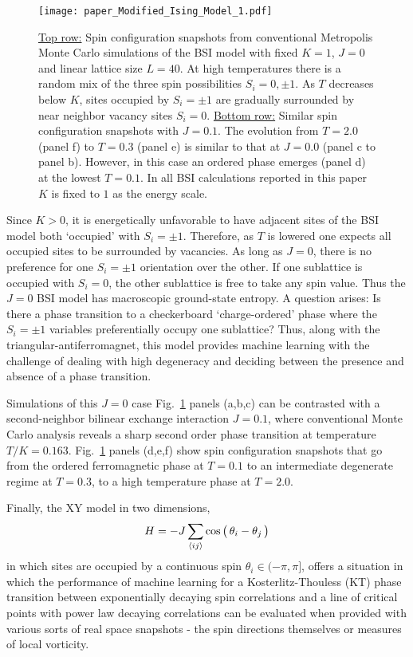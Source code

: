 \documentclass[pra,letterpaper,10pt,twocolumn]{revtex4}
\begin{document}
\begin{figure}[!h]
\texttt{[image: paper\_Modified\_Ising\_Model\_1.pdf]}  
\caption{
\underline{Top row:} Spin configuration snapshots from conventional
Metropolis Monte Carlo simulations of the BSI model with fixed $K=1$,
$J=0$ and linear lattice size $L=40$.  At high temperatures there is a
random mix of the three spin possibilities $S_i = 0,\pm 1$.  As $T$
decreases below $K$, sites occupied by $S_i = \pm 1$ are gradually surrounded by
near neighbor vacancy sites $S_i=0$.  \underline{Bottom row:} Similar
spin configuration snapshots with $J=0.1$.  The evolution from $T=2.0$
(panel f) to $T=0.3$ (panel e) is similar to that at $J=0.0$ (panel c to
panel b).  However, in this case an ordered phase emerges (panel d) at
the lowest $T=0.1$.  In all BSI calculations reported in this paper $K$
is fixed to $1$ as the energy scale.  
\label{fig:Modified_Ising_Model_1}
}
\end{figure}

Since $K>0$, it is energetically unfavorable to have adjacent sites of
the BSI model both `occupied' with $S_i=\pm 1$.  Therefore, as $T$ is
lowered one expects all occupied sites to be surrounded by vacancies.
As long as $J=0$, there is no preference for one $S_i=\pm1$ orientation
over the other. 
If one sublattice is occupied with $S_i=0$, the other
sublattice is free to take any spin value. 
Thus the $J=0$ BSI model has
macroscopic ground-state entropy. A question arises: Is there a phase
transition to a checkerboard `charge-ordered' phase where the $S_i=\pm
1$ variables preferentially occupy one sublattice?  Thus, along with the
triangular-antiferromagnet, this model provides machine learning with
the challenge of dealing with high degeneracy and deciding between the
presence and absence of a phase transition.

Simulations of this $J=0$ case Fig.~\ref{fig:Modified_Ising_Model_1}
panels (a,b,c) can be contrasted with a second-neighbor bilinear
exchange interaction $J=0.1$, where conventional Monte Carlo analysis
reveals a sharp second order phase transition at temperature
$T/K=0.163$.  Fig.~\ref{fig:Modified_Ising_Model_1} panels (d,e,f) show
spin configuration snapshots that go from the ordered ferromagnetic
phase at $T=0.1$ to an intermediate degenerate regime at $T=0.3$, to a
high temperature phase at $T=2.0$. 

Finally, the XY model in two dimensions,
\begin{align}
H = -J \sum_{\langle ij \rangle} 
{\rm cos}\,\big(\,\theta_i - \theta_j \,\big)
\label{eq:ham_XY}
\end{align}
in which sites are occupied by a continuous spin $\theta_i \in (-\pi,\pi]$, offers a situation in which the performance of machine learning
for a Kosterlitz-Thouless (KT) \cite{Barouch, Kosterlitz} phase
transition between exponentially decaying spin correlations and a line
of critical points with power law decaying correlations can be evaluated
when provided with various sorts of real space snapshots - the spin
directions themselves or measures of local vorticity.
\end{document}
